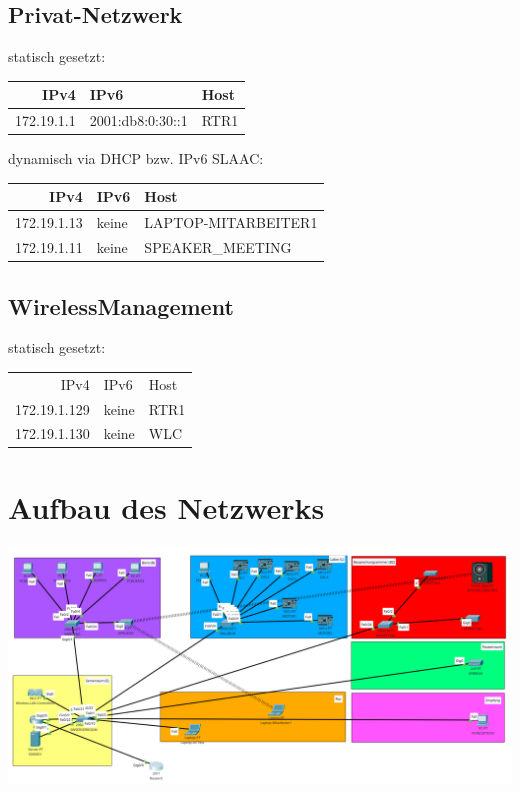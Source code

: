 \documentclass[11pt]{article}
\begin{document}
\subsection{Privat-Netzwerk}
\label{sec:org9a1d722}

statisch gesetzt:

\begin{center}
\begin{tabular}{rll}
IPv4 & IPv6 & Host\\
\hline
172.19.1.1 & 2001:db8:0:30::1 & RTR1\\
\end{tabular}
\end{center}

dynamisch via DHCP bzw. IPv6 SLAAC:

\begin{center}
\begin{tabular}{rll}
IPv4 & IPv6 & Host\\
\hline
172.19.1.13 & keine & LAPTOP-MITARBEITER1\\
172.19.1.11 & keine & SPEAKER\_MEETING\\
\end{tabular}
\end{center}
\subsection{WirelessManagement}
\label{sec:orgba2ba36}

statisch gesetzt:

\begin{center}
\begin{tabular}{rll}
IPv4 & IPv6 & Host\\
172.19.1.129 & keine & RTR1\\
172.19.1.130 & keine & WLC\\
\end{tabular}
\end{center}
\section{Aufbau des Netzwerks}
\label{sec:org88efcca}


\begin{center}
\includegraphics[width=.9\linewidth]{./bfki_projekt_cisco_logical.png}
\end{center}
\end{document}
